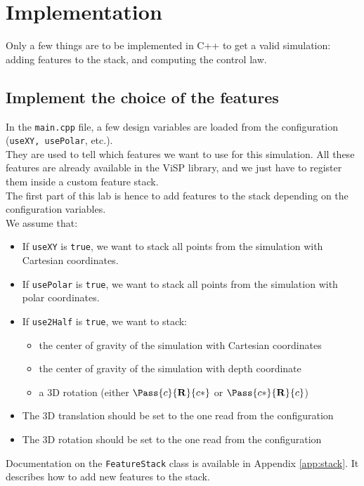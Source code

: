 \documentclass{ecnreport}
\begin{document}
\section{Implementation}

Only a few things are to be implemented in C++ to get a valid simulation: adding features to the stack, and computing the control law.

\subsection{Implement the choice of the features}

In the \texttt{main.cpp} file, a few design variables are loaded from the configuration (\texttt{useXY, usePolar}, etc.).\\

They are used to tell which features we want to use for this simulation. All these features are already available in the ViSP library, and we just have to register them inside a custom feature stack.\\

The first part of this lab is hence to add features to the stack depending on the configuration variables.\\
We assume that:
\begin{itemize}
 \item If \texttt{useXY} is \texttt{true}, we want to stack all points from the simulation with Cartesian coordinates.
 \item If \texttt{usePolar} is \texttt{true}, we want to stack all points from the simulation with polar coordinates.
 \item If \texttt{use2Half} is \texttt{true}, we want to stack:
 \begin{itemize}
  \item the center of gravity of the simulation with Cartesian coordinates
  \item the center of gravity of the simulation with depth coordinate
  \item a 3D rotation (either $\Pass{c}{\mathbf{R}}{c*}$ or $\Pass{c*}{\mathbf{R}}{c}$)
 \end{itemize}
 \item The 3D translation should be set to the one read from the configuration
 \item The 3D rotation should be set to the one read from the configuration
\end{itemize}
Documentation on the \texttt{FeatureStack} class is available in Appendix \ref{app:stack}. It describes how to add new features to the stack.\\
\end{document}
